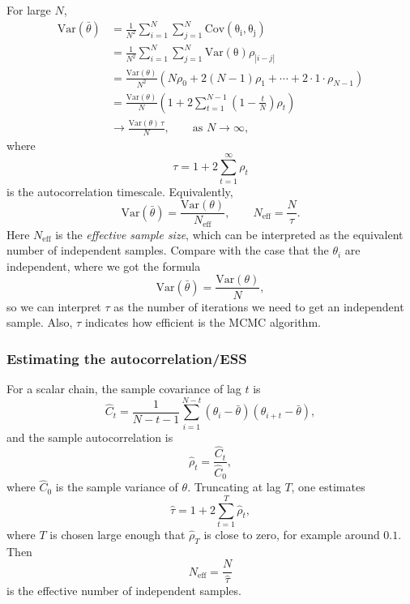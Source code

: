 \documentclass[11pt, titlepage]{article} %
\numberwithin{equation}{section}
\theoremstyle{definition}
\numberwithin{assumption}{section}
\begin{document}
For large $N$,
\begin{align*}
    \mathrm{Var}(\bar\theta)
    &=\frac{1}{N^2}\sum_{i=1}^N\sum_{j=1}^N\mathrm{Cov(\theta_i,\theta_j)}\\
    &=\frac{1}{N^2}\sum_{i=1}^N\sum_{j=1}^N\mathrm{Var(\theta)}\rho_{|i-j|}\\
    &=\frac{\mathrm{Var}(\theta)}{N^2}\left(N\rho_0+2(N-1)\rho_1+\cdots+2\cdot 1\cdot\rho_{N-1}\right)\\
    &=\frac{\mathrm{Var}(\theta)}{N}\left(1+2\sum_{t=1}^{N-1}\left(1-\frac{t}{N}\right)\rho_t\right)\\
    &\to \frac{\mathrm{Var}(\theta)\,\tau}{N}, \qquad \text{as $N\to\infty$},
\end{align*}
where
\begin{equation*}
    \tau=1+2\sum_{t=1}^\infty \rho_t
\end{equation*}
is the autocorrelation timescale. Equivalently,
\begin{equation*}
    \mathrm{Var}(\bar\theta)=\frac{\mathrm{Var}(\theta)}{N_{\mathrm{eff}}},
    \qquad
    N_{\mathrm{eff}}=\frac{N}{\tau}.
\end{equation*}
Here $N_{\mathrm{eff}}$ is the \textit{effective sample size}, which can be interpreted as the equivalent number of independent samples. Compare with the case that the $\theta_i$ are independent, where we got the formula
\begin{equation*}
     \mathrm{Var}(\bar\theta)=\frac{\mathrm{Var}(\theta)}{N},
\end{equation*}
so we can interpret $\tau$ as the number of iterations we need to get an independent sample. Also, $\tau$ indicates how efficient is the MCMC algorithm.

\subsubsection*{Estimating the autocorrelation/ESS}

For a scalar chain, the sample covariance of lag $t$ is
\begin{equation*}
    \hat C_t
    =
    \frac{1}{N-t-1}\sum_{i=1}^{N-t}(\theta_i-\bar\theta)(\theta_{i+t}-\bar\theta),
\end{equation*}
and the sample autocorrelation is
\begin{equation*}
    \hat\rho_t=\frac{\hat C_t}{\hat C_0},
\end{equation*}
where $\hat C_0$ is the sample variance of $\theta$.
Truncating at lag $T$, one estimates
\begin{equation*}
    \hat\tau=1+2\sum_{t=1}^T \hat\rho_t,
\end{equation*}
where $T$ is chosen large enough that $\hat\rho_T$ is close to zero, for example around $0.1$.
Then
\begin{equation*}
    N_{\mathrm{eff}}=\frac{N}{\hat\tau}
\end{equation*}
is the effective number of independent samples.
\end{document}
